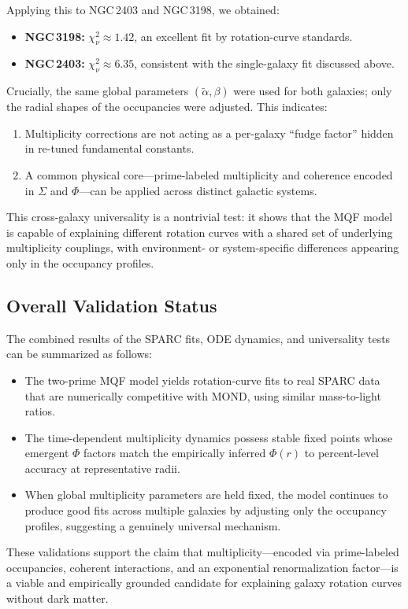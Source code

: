 \documentclass[11pt]{article}
\begin{document}
Applying this to NGC\,2403 and NGC\,3198, we obtained:
\begin{itemize}
  \item \textbf{NGC\,3198:} \(\chi^2_\nu \approx 1.42\), an excellent fit by rotation-curve standards.
  \item \textbf{NGC\,2403:} \(\chi^2_\nu \approx 6.35\), consistent with the single-galaxy fit discussed above.
\end{itemize}
Crucially, the same global parameters \((\tilde{\alpha},\beta)\) were used for both galaxies; only the radial shapes of the occupancies were adjusted. This indicates:
\begin{enumerate}
  \item Multiplicity corrections are not acting as a per-galaxy ``fudge factor'' hidden in re-tuned fundamental constants.
  \item A common physical core---prime-labeled multiplicity and coherence encoded in \(\Sigma\) and \(\Phi\)---can be applied across distinct galactic systems.
\end{enumerate}
This cross-galaxy universality is a nontrivial test: it shows that the MQF model is capable of explaining different rotation curves with a shared set of underlying multiplicity couplings, with environment- or system-specific differences appearing only in the occupancy profiles.

\subsection{Overall Validation Status}

The combined results of the SPARC fits, ODE dynamics, and universality tests can be summarized as follows:
\begin{itemize}
  \item The two-prime MQF model yields rotation-curve fits to real SPARC data that are numerically competitive with MOND, using similar mass-to-light ratios.
  \item The time-dependent multiplicity dynamics possess stable fixed points whose emergent \(\Phi\) factors match the empirically inferred \(\Phi(r)\) to percent-level accuracy at representative radii.
  \item When global multiplicity parameters are held fixed, the model continues to produce good fits across multiple galaxies by adjusting only the occupancy profiles, suggesting a genuinely universal mechanism.
\end{itemize}
These validations support the claim that multiplicity---encoded via prime-labeled occupancies, coherent interactions, and an exponential renormalization factor---is a viable and empirically grounded candidate for explaining galaxy rotation curves without dark matter.
\end{document}
